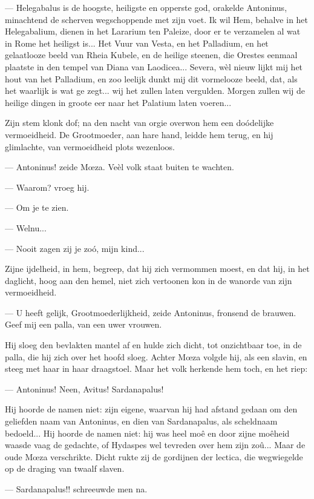 \documentclass[a4paper, 12pt, oneside, dutch]{article}
\begin{document}
--- Helegabalus is de hoogste, heiligste en opperste god, orakelde Antoninus, minachtend de scherven wegschoppende met zijn voet. Ik wil Hem, behalve in het Helegabalium, dienen in het Lararium ten Paleize, door er te verzamelen al wat in Rome het heiligst is... Het Vuur van Vesta, en het Palladium, en het gelaatlooze beeld van Rheia Kubele, en de heilige steenen, die Orestes eenmaal plaatste in den tempel van Diana van Laodicea... Severa, wèl nieuw lijkt mij het hout van het Palladium, en zoo leelijk dunkt mij dit vormelooze beeld, dat, als het waarlijk is wat ge zegt... wij het zullen laten vergulden. Morgen zullen wij de heilige dingen in groote eer naar het Palatium laten voeren...

Zijn stem klonk dof; na den nacht van orgie overwon hem een doódelijke vermoeidheid. De Grootmoeder, aan hare hand, leidde hem terug, en hij glimlachte, van vermoeidheid plots wezenloos.

--- Antoninus! zeide Mœza. Veèl volk staat buiten te wachten.

--- Waarom? vroeg hij.

--- Om je te zien.

--- Welnu...

--- Nooit zagen zij je zoó, mijn kind...

Zijne ijdelheid, in hem, begreep, dat hij zich vermommen moest, en dat hij, in het daglicht, hoog aan den hemel, niet zich vertoonen kon in de wanorde van zijn vermoeidheid.

--- U heeft gelijk, Grootmoederlijkheid, zeide Antoninus, fronsend de brauwen. Geef mij een palla, van een uwer vrouwen.

Hij sloeg den bevlakten mantel af en hulde zich dicht, tot onzichtbaar toe, in de palla, die hij zich over het hoofd sloeg. Achter Mœza volgde hij, als een slavin, en steeg met haar in haar draagstoel. Maar het volk herkende hem toch, en het riep:

--- Antoninus! Neen, Avitus! Sardanapalus!

Hij hoorde de namen niet: zijn eigene, waarvan hij had afstand gedaan om den geliefden naam van Antoninus, en dien van Sardanapalus, als scheldnaam bedoeld... Hij hoorde de namen niet: hij was heel moê en door zijne moêheid waasde vaag de gedachte, of Hydaspes wel tevreden over hem zijn zoû... Maar de oude Mœza verschrikte. Dicht rukte zij de gordijnen der lectica, die wegwiegelde op de draging van twaalf slaven.

--- Sardanapalus!! schreeuwde men na.
\end{document}
